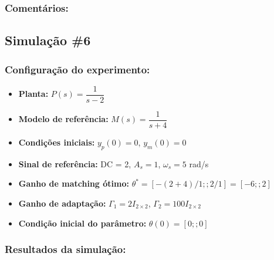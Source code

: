 \documentclass[10pt]{article}
\begin{document}
\subsubsection{Comentários:}

\subsection{Simulação \#6}
\subsubsection{Configuração do experimento:}
\begin{itemize}
\item \textbf{Planta:} $P(s) = \dfrac{1}{s - 2}$
\item \textbf{Modelo de referência:} $M(s) = \dfrac{1}{s + 4}$
\item \textbf{Condições iniciais:} $y_p(0)=0$, $y_m(0)=0$
\item \textbf{Sinal de referência:} DC = 2, $A_s=1$, $\omega_s=5$ rad/s
\item \textbf{Ganho de matching ótimo:} $\theta^* = [-(2+4)/1;;2/1] = [-6;;2]$
\item \textbf{Ganho de adaptação:} $\Gamma_1 = 2I_{2\times2}$, $\Gamma_2 = 100I_{2\times2}$
\item \textbf{Condição inicial do parâmetro:} $\theta(0) = [0;;0]$
\end{itemize}

\subsubsection{Resultados da simulação:}
\end{document}
